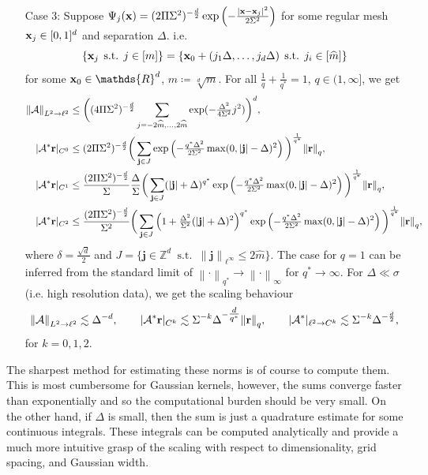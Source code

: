 \documentclass[10pt,a4paper,onecolumn]{article}
\numberwithin{equation}{section}
\let\F\mathds\let\C\mathcal\newcommand{\R}{\F{R}}\newcommand{\A}{\C{A}}
\newcommand{\norm}[1]{{\left\lVert #1 \right\rVert}}
\DeclareMathOperator{\st}{\;s.t.\;}\DeclareMathOperator{\as}{\;a.s.\;}\renewcommand{\epsilon}{\varepsilon}
\renewcommand{\vec}{\mathbf}
\newcommand{\UCmath}[1]{%
	\begingroup
	\ucmathlist\uppercase\expandafter{#1}%
	\endgroup
}
\newcommand{\ucmathlist}{%
	\def\alpha{\mathrm{A}}%
	\def\beta{\mathrm{B}}%
	\let\gamma=\Gamma
	\let\delta=\Delta
	\def\epsilon{\mathrm{E}}%
	\def\varepsilon{\mathrm{E}}%
	\def\zeta{\mathrm{Z}}%
	\def\eta{\mathrm{H}}%
	\let\theta=\Theta
	\let\vartheta=\Theta
	\def\iota{\mathrm{I}}%
	\def\kappa{\mathrm{K}}%
	\let\lambda=\Lambda
	\def\mu{\mathrm{M}}%
	\def\nu{\mathrm{N}}%
	\let\xi=\Xi
	\let\pi=\Pi
	\let\varpi=\Pi
	\def\rho{\mathrm{P}}%
	\def\varrho{\mathrm{P}}%
	\let\sigma=\Sigma
	\def\tau{\mathrm{T}}%
	\let\upsilon=\Upsilon
	\let\phi=\Phi
	\let\varphi=\Phi
	\def\chi{\mathrm{X}}%
	\let\psi=\Psi
	\let\omega=\Omega
}
\newcommand{\caps}[1]{\UCmath{#1}}
\newcommand*{\vard}[1]{%
	\IfEqCase{#1}{%
		{0}{\varphi}%
		{1}{\psi}%
	}[\varphi #1]%
}
\newcommand*{\varx}[1]{%
	\IfEqCase{#1}{%
		{0}{x}%
		{1}{y}%
		{2}{z}%
		{3}{r}%
	}[x#1]%
}
\newcommand*{\Varx}[1]{\caps{\varx{#1}}}
\newcommand*{\vvarx}[1]{\vec{\varx{#1}}}\newcommand*{\vVarx}[1]{\vec{\Varx{#1}}}
\begin{document}
\begin{theorem}
{\begin{enumerate}
			\item[Case 3:] Suppose $\vard1_j(\vvarx0) = (2\pi\sigma^2)^{-\frac{d}{2}}\exp\left(-\frac{|\vvarx0-\vvarx0_j|^2}{2\sigma^2}\right)$ for some regular mesh $\vvarx0_j\in[0,1]^d$ and separation $\Delta$. i.e. 
			$$\{\vvarx0_j\st j\in[m]\} = \{\vvarx0_0 + (j_1\Delta,\ldots,j_d\Delta)\st j_i\in[\hat m]\}$$
			for some $\vvarx0_0\in\R^d$, $\hat m\coloneqq\sqrt[d]{m}$. For all $\frac1q + \frac{1}{q^*} = 1$, $q\in(1,\infty]$, we get
			\begin{align*}
				\norm{\A}_{L^2\to\ell^2} &\leq \bigg((4\pi\sigma^2)^{-\frac d2}\sum_{j=-2\hat m,\ldots,2\hat m}\exp(-\tfrac{\Delta^2}{4\sigma^2}j^2)\bigg)^d,
				\\ |\A^*\vvarx3|_{C^0} &\leq (2\pi\sigma^2)^{-\frac{d}{2}}\bigg(\sum_{\vec j\in J}\exp\left(-\tfrac{q^*\Delta^2}{2\sigma^2}\max(0,|\vec j|-\delta)^2\right)\bigg)^{\frac1{q^*}}\norm{\vvarx3}_q,
				\\ |\A^*\vvarx3|_{C^1} &\leq \frac{(2\pi\sigma^2)^{-\frac{d}{2}}}{\sigma}\frac{\Delta}{\sigma}\bigg(\sum_{\vec j\in J}(|\vec j|+\delta)^{q^*}\exp\left(-\tfrac{q^*\Delta^2}{2\sigma^2}\max(0,|\vec j|-\delta)^2\right)\bigg)^{\frac1{q^*}}\norm{\vvarx3}_q,
				\\ |\A^*\vvarx3|_{C^2} &\leq \frac{(2\pi\sigma^2)^{-\frac{d}{2}}}{\sigma^2} \bigg(\sum_{\vec j\in J} \left(1+\tfrac{\Delta^2}{\sigma^2}(|\vec j|+\delta)^2\right)^{q^*}\exp\left(-\tfrac{q^*\Delta^2}{2\sigma^2}\max(0,|\vec j|-\delta)^2\right)\bigg)^{\frac1{q^*}} \norm{\vvarx3}_q,
			\end{align*}
			where $\delta= \frac{\sqrt d}{2}$ and $J=\{\vec j\in\F Z^d \st \norm{\vec j}_{\ell^\infty}\leq 2\hat m\}$. The case for $q=1$ can be inferred from the standard limit of $\norm\cdot_{{q^*}}\to \norm\cdot_{\infty}$ for $q^*\to\infty$. For $\Delta\ll\sigma$ (i.e. high resolution data), we get the scaling behaviour
			$$ \norm{\A}_{L^2\to\ell^2} \lesssim \Delta^{-d}, \qquad |\A^*\vvarx3|_{C^k} \lesssim \sigma^{-k}\Delta^{-\tfrac{d}{q^*}}\norm{\vvarx3}_q, \qquad |\A^*|_{\ell^2\to C^k} \lesssim \sigma^{-k}\Delta^{-\frac{d}{2}},$$
			for $k=0,1,2$.
		\end{enumerate}
	}
\end{theorem}

The sharpest method for estimating these norms is of course to compute them. This is most cumbersome for Gaussian kernels, however, the sums converge faster than exponentially and so the computational burden should be very small. On the other hand, if $\Delta$ is small, then the sum is just a quadrature estimate for some continuous integrals. These integrals can be computed analytically and provide a much more intuitive grasp of the scaling with respect to dimensionality, grid spacing, and Gaussian width.
\end{document}
